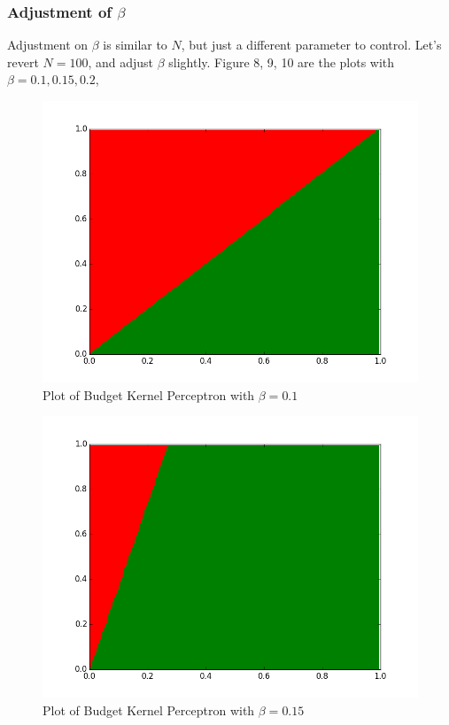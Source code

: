 \documentclass[submit]{harvardml}
\begin{document}
\subsubsection*{Adjustment of $\beta$}

Adjustment on $\beta$ is similar to $N$, but just a different parameter to control. Let's revert $N=100$, and adjust $\beta$ slightly. Figure 8, 9, 10 are the plots with $\beta=0.1, 0.15, 0.2$,

 \begin{figure}
     \centering
     \includegraphics[scale=0.3]{bk-beta01.png}
     \caption{Plot of Budget Kernel Perceptron with $\beta=0.1$}
 \end{figure}
 
  \begin{figure}
     \centering
     \includegraphics[scale=0.3]{bk-beta014.png}
     \caption{Plot of Budget Kernel Perceptron with $\beta=0.15$}
 \end{figure}
 
\end{document}
